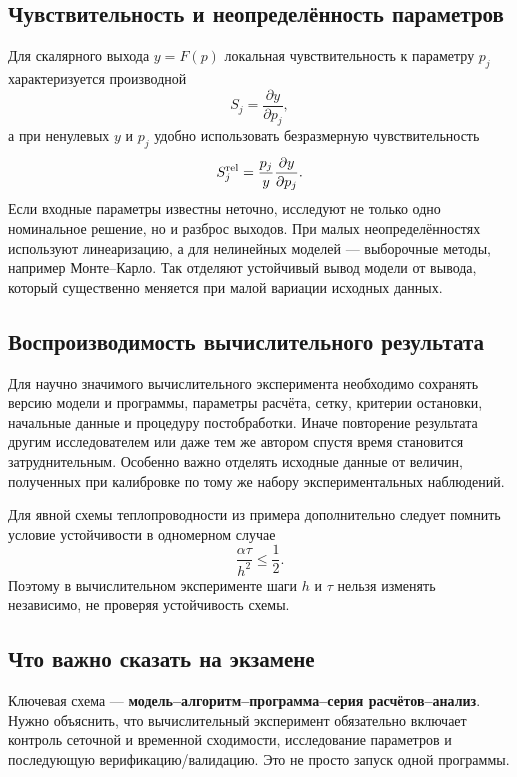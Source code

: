 \subsection{Чувствительность и неопределённость параметров}

Для скалярного выхода $y=F(p)$ локальная чувствительность к параметру $p_j$
характеризуется производной
\[
    S_j=\frac{\partial y}{\partial p_j},
\]
а при ненулевых $y$ и $p_j$ удобно использовать безразмерную чувствительность
\[
    S_j^{\rm rel}=\frac{p_j}{y}\frac{\partial y}{\partial p_j}.
\]
Если входные параметры известны неточно, исследуют не только одно номинальное
решение, но и разброс выходов. При малых неопределённостях используют
линеаризацию, а для нелинейных моделей --- выборочные методы, например Монте--Карло.
Так отделяют устойчивый вывод модели от вывода, который существенно меняется при
малой вариации исходных данных.

\subsection{Воспроизводимость вычислительного результата}

Для научно значимого вычислительного эксперимента необходимо сохранять
версию модели и программы, параметры расчёта, сетку, критерии остановки,
начальные данные и процедуру постобработки. Иначе повторение результата другим
исследователем или даже тем же автором спустя время становится затруднительным.
Особенно важно отделять исходные данные от величин, полученных при калибровке по
тому же набору экспериментальных наблюдений.

Для явной схемы теплопроводности из примера дополнительно следует помнить
условие устойчивости в одномерном случае
\[
    \frac{\alpha\tau}{h^2}\le\frac12.
\]
Поэтому в вычислительном эксперименте шаги $h$ и $\tau$ нельзя изменять
независимо, не проверяя устойчивость схемы.

\subsection{Что важно сказать на экзамене}

Ключевая схема --- \textbf{модель--алгоритм--программа--серия расчётов--анализ}.
Нужно объяснить, что вычислительный эксперимент обязательно включает
контроль сеточной и временной сходимости, исследование параметров и
последующую верификацию/валидацию. Это не просто запуск одной программы.

\newpage
